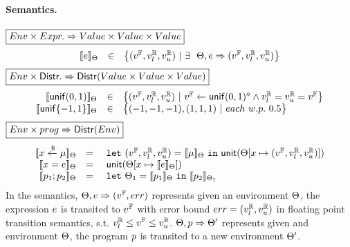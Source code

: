 \documentclass[a4paper,11pt]{article}
\begin{document}
\paragraph{Semantics.}
$\boxed{Env \times Expr. \Rightarrow Value \times Value \times Value }$
%
\[
	\begin{array}{rcl}
	\llbracket e \rrbracket_{\Theta}
	& \in &  
	\big\{(v^{\mathbb{F}}, v^{\mathbb{R}}_{l}, v^{\mathbb{R}}_{u}) ~|~
	\exists ~~  
	\Theta,  
	e \Rightarrow (v^{\mathbb{F}}, v^{\mathbb{R}}_{l}, v^{\mathbb{R}}_{u})\big\}
	\end{array}
\]
%
$
\boxed{Env \times \mathsf{Distr}. \Rightarrow 
\mathsf{Distr}(Value \times Value \times Value )}
$
%
\[
	\begin{array}{rcl}
	\llbracket \mathsf{unif}(0, 1) \rrbracket_{\Theta}
	& \in & 
	\big\{
	(v^{\mathbb{F}}, v^{\mathbb{R}}_{l}, v^{\mathbb{R}}_{u}) ~|~
	v^{\mathbb{F}} \leftarrow \mathsf{unif}(0, 1)^{\diamond}
	\land v^{\mathbb{R}}_{l} = v^{\mathbb{R}}_{u} = v^{\mathbb{F}}
	\big\}\\
	\llbracket \mathsf{unif}\{-1, 1\} \rrbracket_{\Theta}
	& \in & 
	\big\{
	(-1, -1, -1), (1, 1, 1) ~|~
	each ~ w.p. ~ 0.5 
	\big\}\\	
	\end{array}
\]
%
$\boxed{Env \times prog \Rightarrow \mathsf{Distr}(Env)}$
\[
	\begin{array}{rcl}
	\llbracket x \xleftarrow{\$} \mu \rrbracket_{\Theta}
	& = & 
	~\mathtt{let}~ (v^{\mathbb{F}}, v^{\mathbb{R}}_{l}, v^{\mathbb{R}}_{u}) = \llbracket \mu \rrbracket_{\Theta} 
	~\mathtt{in}~ 
	\mathsf{unit}(\Theta[x \mapsto (v^{\mathbb{F}}, v^{\mathbb{R}}_{l}, v^{\mathbb{R}}_{u})])
	\\
	\llbracket x = e \rrbracket_{\Theta}
	& = &  
	~\mathsf{unit}(\Theta[x \mapsto \llbracket e \rrbracket_{\Theta}])
	\\
	\llbracket p_1; p_2 \rrbracket_{\Theta}
	& = &  ~\mathtt{let}~  \Theta_1 = 
	\llbracket p_1 \rrbracket_{\Theta} ~\mathtt{in}~
	\llbracket p_2 \rrbracket_{\Theta_1} 
	\end{array}
\]
In the semantics, 
$\Theta, e \Rightarrow (v^{\mathbb{F}}, err)$ represents given an environment $\Theta$, the expression $e$
is transited to $v^{\mathbb{F}}$ with error bound $err = (v^{\mathbb{R}}_{l}, v^{\mathbb{R}}_{u})$ in floating point transition semantics, s.t. $v^{\mathbb{R}}_{l} \leq v^{\mathbb{F}} \leq v^{\mathbb{R}}_{u}$. 
$\Theta, p \Rightarrow \Theta'$ represents given and environment $\Theta$, the program $p$ is transited to a new environment $\Theta'$.
\end{document}
